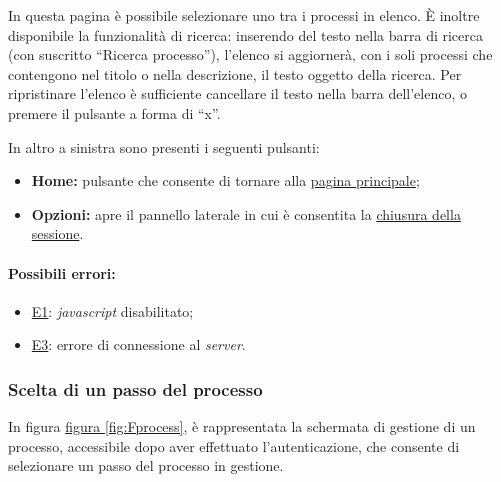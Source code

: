 In questa pagina è possibile selezionare uno tra i processi in elenco. È inoltre disponibile la funzionalità di ricerca: inserendo del testo nella barra di ricerca (con suscritto ``Ricerca processo''), l'elenco si aggiornerà, con i soli processi che contengono nel titolo o nella descrizione, il testo oggetto della ricerca.
Per ripristinare l'elenco è sufficiente cancellare il testo nella barra dell'elenco, o premere il pulsante a forma di ``x''.

In altro a sinistra sono presenti i seguenti pulsanti:
\begin{itemize}
\item \textbf{Home:} pulsante che consente di tornare alla \hyperref[home]{pagina principale};
\item \textbf{Opzioni:} apre il pannello laterale in cui è consentita la \hyperref[logout]{chiusura della sessione}.
\end{itemize}

\paragraph*{Possibili errori:}
\begin{itemize}
\item \hyperref[e1]{E1}: \textit{javascript} disabilitato;
\item \hyperref[e3]{E3}: errore di connessione al \textit{server}.
\end{itemize}

\subsubsection{Scelta di un passo del processo}

In figura \hyperref[fig:Fprocess]{figura \ref{fig:Fprocess}}, è rappresentata la schermata di gestione di un processo, accessibile dopo aver effettuato l'autenticazione, che consente di selezionare un passo del processo in gestione.

